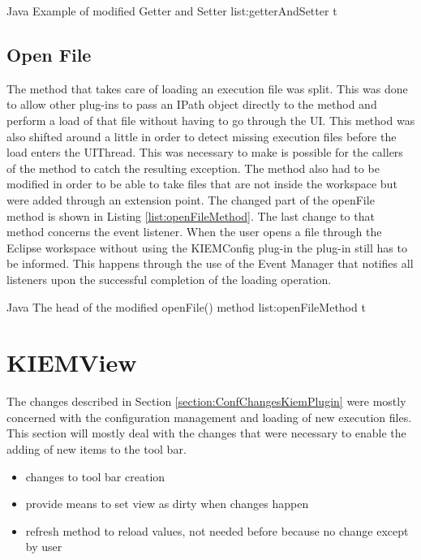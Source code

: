 \listingjava
{}
{Java}
{Example of modified Getter and Setter}
{list:getterAndSetter}
{t}


\subsection{Open File}
\label{section:ConfKiemOpenFile}
The method that takes care of loading an execution file was split. This was done to allow
other plug-ins to pass an IPath object directly to the method and perform a load of that file without
having to go through the \ac{UI}. This method was also shifted around a little in order to detect
missing execution files before the load enters the UIThread. This was necessary to make is possible for
the callers of the method to catch the resulting exception.
The method also had to be modified in order to be able to take files that are not inside the workspace
but were added through an extension point. The changed part of the openFile method is shown in 
Listing \ref{list:openFileMethod}.
The last change to that method concerns the event listener. When the user opens a file through the
Eclipse workspace without using the \ac{KIEMConfig} plug-in the plug-in still has to be informed.
This happens through the use of the Event Manager that notifies all listeners upon the successful
completion of the loading operation.

\listingjava
{}
{Java}
{The head of the modified openFile() method}
{list:openFileMethod}
{t}


\section{KIEMView}
\label{section:ConfChangesKiemView}
The changes described in Section \ref{section:ConfChangesKiemPlugin} were mostly concerned with the
configuration management and loading of new execution files. This section will mostly deal with the changes
that were necessary to enable the adding of new items to the tool bar.

\begin{itemize}
 \item changes to tool bar creation
 \item provide means to set view as dirty when changes happen
 \item refresh method to reload values, not needed before because no change except by user
\end{itemize}